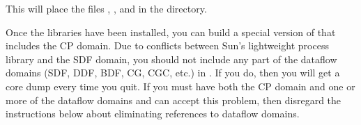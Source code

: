 \noindent
This will place the files , , and
 in the  directory.

Once the libraries have been installed, you can build a special version
of  that includes the CP domain.  Due to conflicts
between Sun's lightweight process library and the SDF domain, you
should not include any part of the dataflow domains (SDF, DDF, BDF, CG,
CGC, etc.) in .  If you do, then you will get a core dump
every time you quit.
If you must have both the CP domain and one or
more of the dataflow domains and can accept this problem, then
disregard the instructions below about eliminating references to
dataflow domains.

